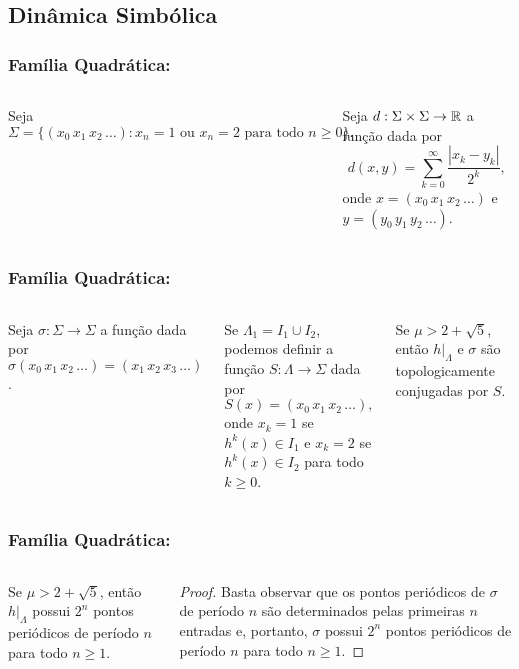 \subsection{Dinâmica Simbólica}


\begin{frame}
\vspace{5pt}
\frametitle{Família Quadrática: \subsecname}
\begin{columns}
\column{\dimexpr\paperwidth-15pt}

Seja
$$\Sigma = \lbrace (x_0 \, x_1 \, x_2 \, \dots) : x_n = 1 \text{ ou } x_n = 2 \text{ para todo } n \geq 0 \rbrace.$$

Seja $d : \Sigma \times \Sigma \to \mathbb{R}$ a função dada por
$$d(x, y) = \sum_{k=0}^\infty \frac{|x_k - y_k|}{2^k},$$
onde $x = (x_0 \, x_1 \, x_2 \, \dots)$ e $y = (y_0 \, y_1 \, y_2 \, \dots)$.

\end{columns}
\end{frame}


\begin{frame}
\vspace{5pt}
\frametitle{Família Quadrática: \subsecname}
\begin{columns}
\column{\dimexpr\paperwidth-15pt}

Seja $\sigma: \Sigma \to \Sigma$ a função dada por $\sigma(x_0 \, x_1 \, x_2 \, \dots) = (x_1 \, x_2 \, x_3 \, \dots)$.

Se $\Lambda_1 = I_1 \cup I_2$, podemos definir a função $S: \Lambda \to \Sigma$ dada por
$$S(x) = (x_0 \, x_1 \, x_2 \, \dots),$$ onde $x_k = 1$ se $h^k(x) \in I_1$ e $x_k = 2$ se $h^k(x) \in I_2$ para todo $k \geq 0$.

\begin{theorem}
Se $\mu > 2 + \sqrt{5}$, então $h|_\Lambda$ e $\sigma$ são topologicamente conjugadas por $S$.
\end{theorem}

\end{columns}
\end{frame}


\begin{frame}
\vspace{5pt}
\frametitle{Família Quadrática: \subsecname}
\begin{columns}
\column{\dimexpr\paperwidth-15pt}

\begin{corollary}
Se $\mu > 2 + \sqrt{5}$, então $h|_\Lambda$ possui $2^n$ pontos periódicos de período $n$ para todo $n \geq 1$.
\end{corollary}

\begin{proof}
Basta observar que os pontos periódicos de $\sigma$ de período $n$ são determinados pelas primeiras $n$ entradas e, portanto, $\sigma$ possui $2^n$ pontos periódicos de período $n$ para todo $n \geq 1$.
\end{proof}

\end{columns}
\end{frame}
